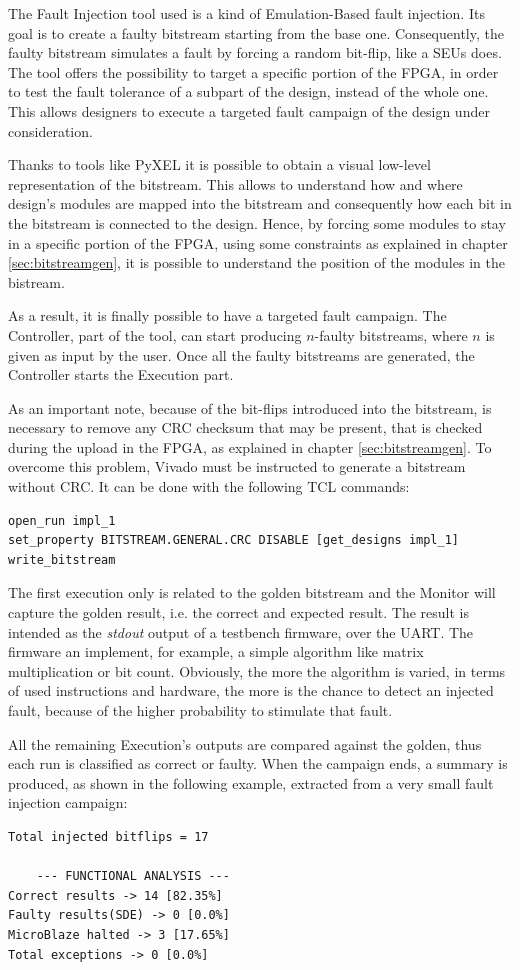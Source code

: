 The Fault Injection tool used is a kind of Emulation-Based fault injection. Its goal is to create a faulty bitstream starting from the base one. Consequently, the faulty bitstream simulates a fault by forcing a random bit-flip, like a SEUs does. The tool offers the possibility to target a specific portion of the FPGA, in order to test the fault tolerance of a subpart of the design, instead of the whole one. This allows designers to execute a targeted fault campaign of the design under consideration. \bigskip

Thanks to tools like PyXEL \cite{8632000} it is possible to obtain a visual low-level representation of the bitstream. This allows to understand how and where design's modules are mapped into the bitstream and consequently how each bit in the bitstream is connected to the design. Hence, by forcing some modules to stay in a specific portion of the FPGA, using some constraints as explained in chapter \ref{sec:bitstreamgen}, it is possible to understand the position of the modules in the bistream. \bigskip

As a result, it is finally possible to have a targeted fault campaign. The Controller, part of the tool, can start producing $n$-faulty bitstreams, where $n$ is given as input by the user. Once all the faulty bitstreams are generated, the Controller starts the Execution part.\bigskip

As an important note, because of the bit-flips introduced into the bitstream, is necessary to remove any CRC checksum that may be present, that is checked during the upload in the FPGA, as explained in chapter \ref{sec:bitstreamgen}. To overcome this problem, Vivado must be instructed to generate a bitstream without CRC. It can be done with the following TCL commands:

\begin{lstlisting}[style=tcl]
open_run impl_1
set_property BITSTREAM.GENERAL.CRC DISABLE [get_designs impl_1]
write_bitstream
\end{lstlisting}

The first execution only is related to the golden bitstream and the Monitor will capture the golden result, i.e. the correct and expected result. The result is intended as the \textit{stdout} output of a testbench firmware, over the UART. The firmware an implement, for example, a simple algorithm like matrix multiplication or bit count. Obviously, the more the algorithm is varied, in terms of used instructions and hardware, the more is the chance to detect an injected fault, because of the higher probability to stimulate that fault. \bigskip

All the remaining Execution's outputs are compared against the golden, thus each run is classified as correct or faulty. When the campaign ends, a summary is produced, as shown in the following example, extracted from a very small fault injection campaign:

\begin{lstlisting}[style=preformatted]
Total injected bitflips = 17

    --- FUNCTIONAL ANALYSIS ---
Correct results -> 14 [82.35%]
Faulty results(SDE) -> 0 [0.0%]
MicroBlaze halted -> 3 [17.65%]
Total exceptions -> 0 [0.0%]
\end{lstlisting}
